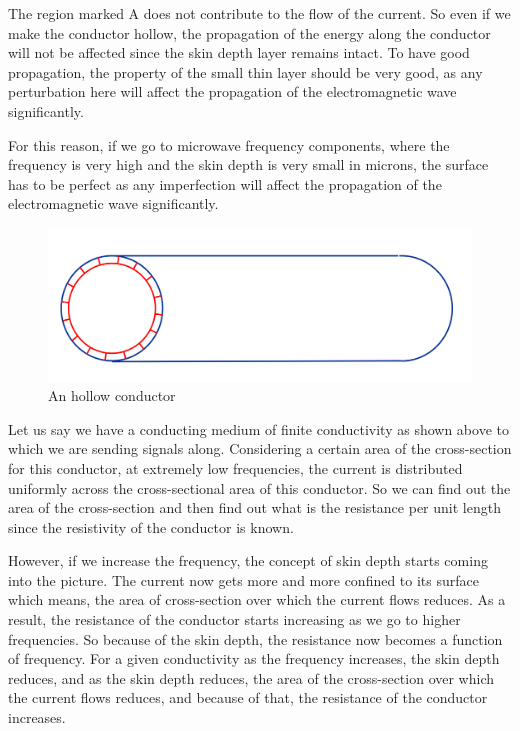 The region marked A does not contribute to the flow of the current. So even if we make the conductor hollow, the propagation of the energy along the conductor will not be affected since the skin depth layer remains intact. To have good propagation, the property of the small thin layer should be very good, as any perturbation here will affect the propagation of the electromagnetic wave significantly.

For this reason, if we go to microwave frequency components, where the frequency is very high and the skin depth is very small in microns, the surface has to be perfect as any imperfection will affect the propagation of the electromagnetic wave significantly.
\begin{figure}[h]
\centering
\includegraphics[scale=0.2]{graphics/Bello263}
\caption{An hollow conductor}
\end{figure}

Let us say we have a conducting medium of finite conductivity as shown above to which we are sending signals along. Considering a certain area of the cross-section for this conductor, at extremely low frequencies, the current is distributed uniformly across the cross-sectional area of this conductor. So we can find out the area of the cross-section and then find out what is the resistance per unit length since the resistivity of the conductor is known.

However, if we increase the frequency, the concept of skin depth starts coming into the picture. The current now gets more and more confined to its surface which means, the area of cross-section over which the current flows reduces. As a result, the resistance of the conductor starts increasing as we go to higher frequencies. So because of the skin depth, the resistance now becomes a function of frequency. For a given conductivity as the frequency increases, the skin depth reduces, and as the skin depth reduces, the area of the cross-section over which the current flows reduces, and because of that, the resistance of the conductor increases.

